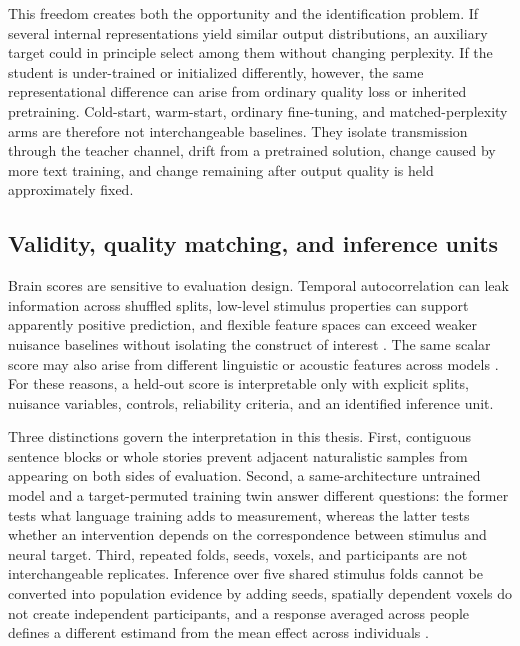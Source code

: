 This freedom creates both the opportunity and the identification problem.
If several internal representations yield similar output distributions, an auxiliary target could in principle select among them without changing perplexity.
If the student is under-trained or initialized differently, however, the same representational difference can arise from ordinary quality loss or inherited pretraining.
Cold-start, warm-start, ordinary fine-tuning, and matched-perplexity arms are therefore not interchangeable baselines.
They isolate transmission through the teacher channel, drift from a pretrained solution, change caused by more text training, and change remaining after output quality is held approximately fixed.

\subsection{Validity, quality matching, and inference units}

Brain scores are sensitive to evaluation design.
Temporal autocorrelation can leak information across shuffled splits, low-level stimulus properties can support apparently positive prediction, and flexible feature spaces can exceed weaker nuisance baselines without isolating the construct of interest \autocite{hadidi2026,jia2026}.
The same scalar score may also arise from different linguistic or acoustic features across models \autocite{oota2024}.
For these reasons, a held-out score is interpretable only with explicit splits, nuisance variables, controls, reliability criteria, and an identified inference unit.

Three distinctions govern the interpretation in this thesis.
First, contiguous sentence blocks or whole stories prevent adjacent naturalistic samples from appearing on both sides of evaluation.
Second, a same-architecture untrained model and a target-permuted training twin answer different questions: the former tests what language training adds to measurement, whereas the latter tests whether an intervention depends on the correspondence between stimulus and neural target.
Third, repeated folds, seeds, voxels, and participants are not interchangeable replicates.
Inference over five shared stimulus folds cannot be converted into population evidence by adding seeds, spatially dependent voxels do not create independent participants, and a response averaged across people defines a different estimand from the mean effect across individuals    .

